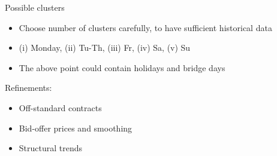 \documentclass{beamer}
\begin{document}
\begin{frame}
    Possible clusters
    \begin{itemize}
        \item Choose number of clusters carefully, to have sufficient historical data

        \item (i) Monday, (ii) Tu-Th, (iii) Fr, (iv) Sa, (v) Su

        \item The above point could contain holidays and bridge days
    \end{itemize}
\end{frame}


\begin{frame}
    Refinements:
    \begin{itemize}
        \item Off-standard contracts
        \item Bid-offer prices and smoothing
        \item Structural trends
    \end{itemize}
\end{frame}


\nocite{*}

\end{document}
